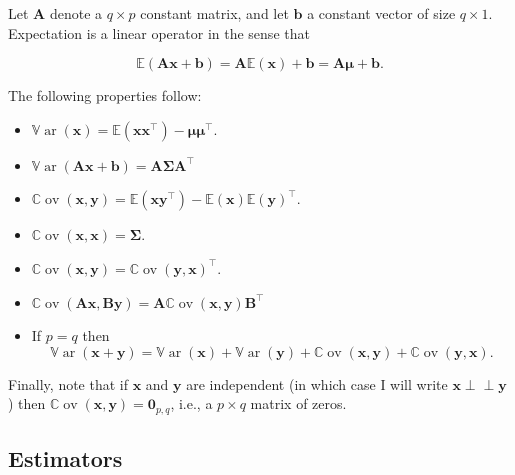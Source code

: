 \documentclass[]{book}
\providecommand{\tightlist}{%
  \setlength{\itemsep}{0pt}\setlength{\parskip}{0pt}}
\theoremstyle{definition}
\theoremstyle{definition}
\theoremstyle{definition}
\theoremstyle{remark}
\begin{document}
Let \(\boldsymbol A\) denote a \(q \times p\) constant matrix, and let \(\boldsymbol b\) a constant vector of size \(q \times 1\).
Expectation is a linear operator in the sense that

\[{\mathbb{E}}(\boldsymbol A\boldsymbol x+ \boldsymbol b) = \boldsymbol A{\mathbb{E}}(\boldsymbol x) + \boldsymbol b=\boldsymbol A\boldsymbol \mu+\boldsymbol b.\]

The following properties follow:

\begin{itemize}
\tightlist
\item
  \({\mathbb{V}\operatorname{ar}}(\boldsymbol x) = {\mathbb{E}}(\boldsymbol x\boldsymbol x^\top) - \boldsymbol \mu\boldsymbol \mu^\top\).
\item
  \({\mathbb{V}\operatorname{ar}}(\boldsymbol A\boldsymbol x+ \boldsymbol b) = \boldsymbol A\boldsymbol \Sigma\boldsymbol A^\top\)
\item
  \({\mathbb{C}\operatorname{ov}}(\boldsymbol x,\boldsymbol y) = {\mathbb{E}}(\boldsymbol x\boldsymbol y^\top) - {\mathbb{E}}(\boldsymbol x) {\mathbb{E}}(\boldsymbol y)^\top\).
\item
  \({\mathbb{C}\operatorname{ov}}(\boldsymbol x,\boldsymbol x) = \boldsymbol \Sigma\).
\item
  \({\mathbb{C}\operatorname{ov}}(\boldsymbol x,\boldsymbol y) = {\mathbb{C}\operatorname{ov}}(\boldsymbol y,\boldsymbol x)^\top\).
\item
  \({\mathbb{C}\operatorname{ov}}(\boldsymbol A\boldsymbol x,\boldsymbol B\boldsymbol y) = \boldsymbol A{\mathbb{C}\operatorname{ov}}(\boldsymbol x,\boldsymbol y)\boldsymbol B^\top\)
\item
  If \(p=q\) then
  \[
  {\mathbb{V}\operatorname{ar}}(\boldsymbol x+ \boldsymbol y) = {\mathbb{V}\operatorname{ar}}(\boldsymbol x) + {\mathbb{V}\operatorname{ar}}(\boldsymbol y) + {\mathbb{C}\operatorname{ov}}(\boldsymbol x,\boldsymbol y) + {\mathbb{C}\operatorname{ov}}(\boldsymbol y,\boldsymbol x).
  \]
\end{itemize}

Finally, note that if \(\boldsymbol x\) and \(\boldsymbol y\) are independent (in which case I will write \(\boldsymbol x\perp \!\!\! \perp\boldsymbol y\)) then \({\mathbb{C}\operatorname{ov}}(\boldsymbol x,\boldsymbol y) = {\mathbf 0}_{p,q}\), i.e., a \(p\times q\) matrix of zeros.

\hypertarget{estimators}{%
\subsection{Estimators}\label{estimators}}
\end{document}
